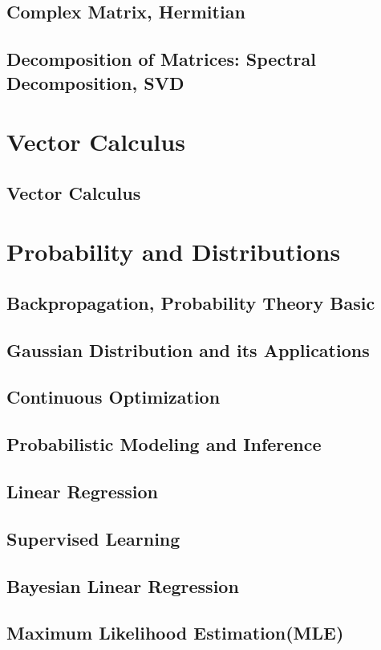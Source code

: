 \documentclass[12pt,openany]{book}
\theoremstyle{definition}
\begin{document}
	\section{Complex Matrix, Hermitian}
	\section{Decomposition of Matrices: Spectral Decomposition, SVD}
	
	\chapter{Vector Calculus}
	\section{Vector Calculus}
	
	\chapter{Probability and Distributions}
	\section{Backpropagation, Probability Theory Basic}
	\section{Gaussian Distribution and its Applications}
	\section{Continuous Optimization}
	\section{Probabilistic Modeling and Inference}
	\section{Linear Regression}
	\section{Supervised Learning}
	\section{Bayesian Linear Regression}
	\section{Maximum Likelihood Estimation(MLE)}
\end{document}
